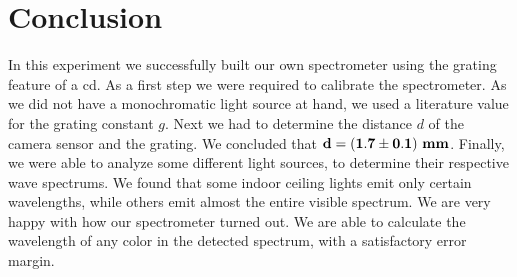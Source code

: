 \section{Conclusion}
    In this experiment we successfully built our own spectrometer using the grating feature of a cd.
    As a first step we were required to calibrate the spectrometer.
    As we did not have a monochromatic light source at hand, we used a literature value for the grating
    constant $g$. Next we had to determine the distance $d$ of the camera sensor and the grating.
    We concluded that $\bf d = (1.7 \pm 0.1) ~\si{\bf\milli\meter}$.
    Finally, we were able to analyze some different light sources, to determine their respective wave spectrums.
    We found that some indoor ceiling lights emit only certain wavelengths, while others emit almost the entire
    visible spectrum.
    We are very happy with how our spectrometer turned out. We are able to calculate the wavelength of any color
    in the detected spectrum, with a satisfactory error margin.

